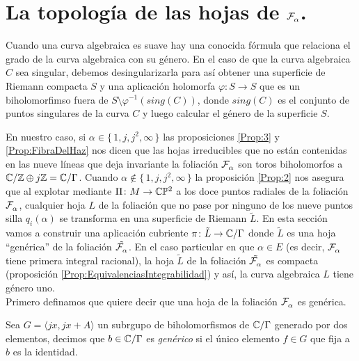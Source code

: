 \section{La topología de las hojas de $\mathcal{F}^{\ }_{\alpha}$.}

Cuando una curva algebraica es suave hay una conocida fórmula que relaciona el grado de la curva algebraica con su género. En el caso de que la curva algebraica $C$ sea singular, debemos desingularizarla para así obtener una superficie de Riemann compacta $S$ y una aplicación holomorfa $\varphi\colon S\rightarrow S$ que es un biholomorfimso fuera de $S\setminus\varphi^{-1}(sing(C))$, donde $sing(C)$ es el conjunto de puntos singulares de la curva $C$ y luego calcular el género de la superficie $S$.

En nuestro caso, si $\alpha\in\{\, 1,j,j^{2},\infty \, \}$ las proposiciones \ref{Prop:3} y \ref{Prop:FibraDelHaz} nos dicen que las hojas irreducibles que no están contenidas en las nueve líneas que deja invariante la foliación $\mathcal{F}^{\ }_{\alpha}$ son toros biholomorfos a $\mathbb{C}/\mathbb{Z}\oplus j\mathbb{Z}=\mathbb{C}/\Gamma$. Cuando $\alpha\notin\{\, 1,j,j^{2},\infty \, \}$ la proposición \ref{Prop:2} nos asegura que al explotar mediante $\Pi\colon M\rightarrow \mathbb{C}\mathbb{P}^2$ a los doce puntos radiales de la foliación $\mathcal{F}^{\ }_{\alpha}$, cualquier hoja $L$ de la foliación que no pase por ninguno de los nueve puntos silla $q_{i}(\alpha)$ se transforma en una superficie de Riemann $\tilde{L}$. En esta sección vamos a construir una aplicación cubriente $\pi\colon \tilde{L}\rightarrow \mathbb{C}/\Gamma$ donde $\tilde{L}$ es una hoja ``genérica'' de la foliación $\tilde{\mathcal{F}^{\ }_{\alpha}}$. En el caso particular en que $\alpha\in E$ (es decir, $\mathcal{F}^{\ }_{\alpha}$ tiene primera integral racional), la hoja $\tilde{L}$ de la foliación $\tilde{\mathcal{F}^{\ }_{\alpha}}$ es compacta (proposición \ref{Prop:EquivalenciasIntegrabilidad}) y así, la curva algebraica $L$ tiene género uno.\\

Primero definamos que quiere decir que una hoja de la foliación $\mathcal{F}^{\ }_{\alpha}$ es genérica.
\begin{defn}
\label{def:PuntoGenerico}
Sea $G=\langle jx,jx+A\rangle$ un subrgupo de biholomorfismos de $\mathbb{C}/\Gamma$ generado por dos elementos, decimos que $b\in\mathbb{C}/\Gamma$ es \emph{genérico} si el único elemento $f\in G$ que fija a $b$ es la identidad. 
\end{defn}
